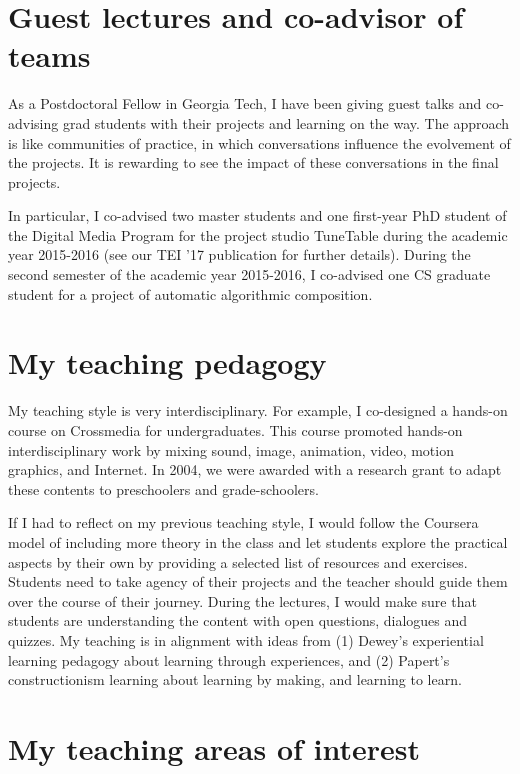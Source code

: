\documentclass[10pt, a4paper]{article}
\begin{document}
\section*{Guest lectures and co-advisor of teams}

As a Postdoctoral Fellow in Georgia Tech, I have been giving guest talks and co-advising grad students with their projects and learning on the way. The approach is like communities of practice, in which conversations influence the evolvement of the projects. It is rewarding to see the impact of these conversations in the final projects.

In particular, I co-advised two master students and one first-year PhD student of the Digital Media Program for the project studio TuneTable during the academic year 2015-2016 (see our TEI '17 publication for further details). During the second semester of the academic year 2015-2016, I co-advised one CS graduate student for a project of automatic algorithmic composition.

\section*{My teaching pedagogy}

My teaching style is very interdisciplinary. For example, I co-designed a hands-on course on Crossmedia for undergraduates. This course promoted hands-on interdisciplinary work by mixing sound, image, animation, video, motion graphics, and Internet. In 2004, we were awarded with a research grant to adapt these contents to preschoolers and grade-schoolers.

If I had to reflect on my previous teaching style, I would follow the Coursera model of including more theory in the class and let students explore the practical aspects by their own by providing a selected list of resources and exercises. Students need to take agency of their projects and the teacher should guide them over the course of their journey. During the lectures, I would make sure that students are understanding the content with open questions, dialogues and quizzes. My teaching is in alignment with ideas from (1) Dewey's experiential learning pedagogy about learning through experiences, and (2) Papert's constructionism learning about learning by making, and learning to learn.

\section*{My teaching areas of interest}
\end{document}
